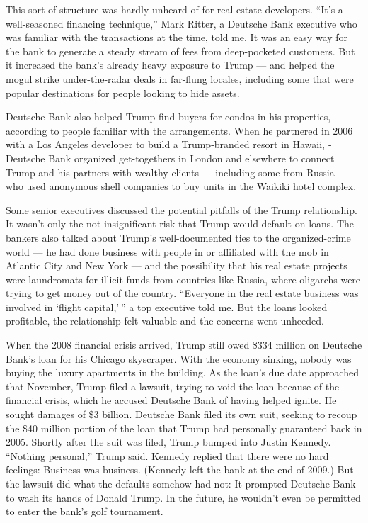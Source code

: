 This sort of structure was hardly unheard-­of for real estate
developers. ``It's a well-­seasoned financing technique,'' Mark Ritter,
a ­Deutsche Bank executive who was familiar with the transactions at the
time, told me. It was an easy way for the bank to generate a steady
stream of fees from deep-­pocketed customers. But it increased the
bank's already heavy exposure to Trump --- and helped the mogul strike
under-­the-­radar deals in far-flung locales, including some that were
popular destinations for people looking to hide assets.

­Deutsche Bank also helped Trump find buyers for condos in his
properties, according to people familiar with the arrangements. When he
partnered in 2006 with a Los Angeles developer to build a Trump-­branded
resort in Hawaii, ­Deutsche Bank organized get-­togethers in London and
elsewhere to connect Trump and his partners with wealthy clients ---
including some from Russia --- who used anonymous shell companies to buy
units in the Waikiki hotel complex.

Some senior executives discussed the potential pitfalls of the Trump
relationship. It wasn't only the not-­insignificant risk that Trump
would default on loans. The bankers also talked about Trump's
well-­documented ties to the organized-­crime world --- he had done
business with people in or affiliated with the mob in Atlantic City and
New York --- and the possibility that his real estate projects were
laundromats for illicit funds from countries like Russia, where
oligarchs were trying to get money out of the country. ``Everyone in the
real estate business was involved in `flight capital,' '' a top
executive told me. But the loans looked profitable, the relationship
felt valuable and the concerns went unheeded.

When the 2008 financial crisis arrived, Trump still owed \$334 million
on ­Deutsche Bank's loan for his Chicago skyscraper. With the economy
sinking, nobody was buying the luxury apartments in the building. As the
loan's due date approached that November, Trump filed a lawsuit, trying
to void the loan because of the financial crisis, which he accused
­Deutsche Bank of having helped ignite. He sought damages of \$3
billion. ­Deutsche Bank filed its own suit, seeking to recoup the \$40
million portion of the loan that Trump had personally guaranteed back in
2005. Shortly after the suit was filed, Trump bumped into Justin
Kennedy. ``Nothing personal,'' Trump said. Kennedy replied that there
were no hard feelings: Business was business. (Kennedy left the bank at
the end of 2009.) But the lawsuit did what the defaults somehow had not:
It prompted Deutsche Bank to wash its hands of Donald Trump. In the
future, he wouldn't even be permitted to enter the bank's golf
tournament.

